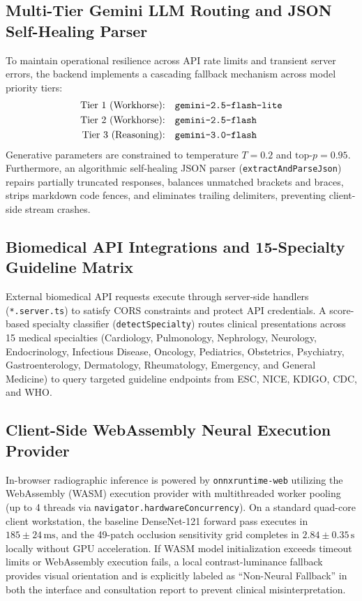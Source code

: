 \documentclass[journal,10pt,twocolumn]{IEEEtran}
\begin{document}
\subsection{Multi-Tier Gemini LLM Routing and JSON Self-Healing Parser}
To maintain operational resilience across API rate limits and transient server errors, the backend implements a cascading fallback mechanism across model priority tiers:
\begin{equation*}
\begin{aligned}
\text{Tier 1 (Workhorse):} & \quad \text{\texttt{gemini-2.5-flash-lite}} \\
\text{Tier 2 (Workhorse):} & \quad \text{\texttt{gemini-2.5-flash}} \\
\text{Tier 3 (Reasoning):} & \quad \text{\texttt{gemini-3.0-flash}}
\end{aligned}
\end{equation*}
Generative parameters are constrained to temperature $T=0.2$ and $\text{top-}p=0.95$. Furthermore, an algorithmic self-healing JSON parser (\texttt{extractAndParseJson}) repairs partially truncated responses, balances unmatched brackets and braces, strips markdown code fences, and eliminates trailing delimiters, preventing client-side stream crashes.

\subsection{Biomedical API Integrations and 15-Specialty Guideline Matrix}
External biomedical API requests execute through server-side handlers (\texttt{*.server.ts}) to satisfy CORS constraints and protect API credentials. A score-based specialty classifier (\texttt{detectSpecialty}) routes clinical presentations across 15 medical specialties (Cardiology, Pulmonology, Nephrology, Neurology, Endocrinology, Infectious Disease, Oncology, Pediatrics, Obstetrics, Psychiatry, Gastroenterology, Dermatology, Rheumatology, Emergency, and General Medicine) to query targeted guideline endpoints from ESC, NICE, KDIGO, CDC, and WHO.

\subsection{Client-Side WebAssembly Neural Execution Provider}
In-browser radiographic inference is powered by \texttt{onnxruntime-web} utilizing the WebAssembly (WASM) execution provider with multithreaded worker pooling (up to 4 threads via \texttt{navigator.hardwareConcurrency}). On a standard quad-core client workstation, the baseline DenseNet-121 forward pass executes in $185 \pm 24\,\text{ms}$, and the 49-patch occlusion sensitivity grid completes in $2.84 \pm 0.35\,\text{s}$ locally without GPU acceleration. If WASM model initialization exceeds timeout limits or WebAssembly execution fails, a local contrast-luminance fallback provides visual orientation and is explicitly labeled as ``Non-Neural Fallback'' in both the interface and consultation report to prevent clinical misinterpretation.
\end{document}
